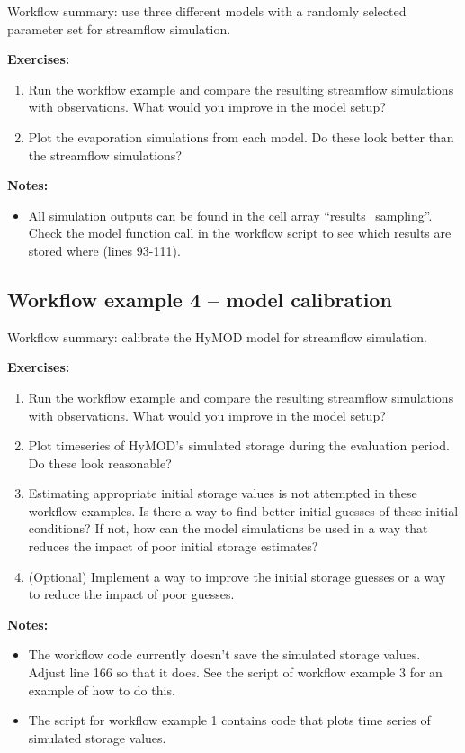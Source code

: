 \documentclass[12pt]{article}
\begin{document}
Workflow summary: use three different models with a randomly selected parameter set for streamflow simulation.

\medskip \noindent
\textbf{Exercises:}
\begin{enumerate}
	\item Run the workflow example and compare the resulting streamflow simulations with observations. What would you improve in the model setup?
	\item Plot the evaporation simulations from each model. Do these look better than the streamflow simulations? 
\end{enumerate}

\medskip \noindent
\textbf{Notes:}
\begin{itemize}
	\item All simulation outputs can be found in the cell array “results\_sampling”. Check the model function call in the workflow script to see which results are stored where (lines 93-111).
\end{itemize}


%
\subsection{Workflow example 4 – model calibration}

Workflow summary: calibrate the HyMOD model for streamflow simulation.

\medskip \noindent
\textbf{Exercises:}
\begin{enumerate}
	\item Run the workflow example and compare the resulting streamflow simulations with observations. What would you improve in the model setup?
	\item Plot timeseries of HyMOD’s simulated storage during the evaluation period. Do these look reasonable? 
	\item Estimating appropriate initial storage values is not attempted in these workflow examples. Is there a way to find better initial guesses of these initial conditions? If not, how can the model simulations be used in a way that reduces the impact of poor initial storage estimates?
	\item (Optional) Implement a way to improve the initial storage guesses or a way to reduce the impact of poor guesses.
\end{enumerate}

\medskip \noindent
\textbf{Notes:}
\begin{itemize}
	\item The workflow code currently doesn’t save the simulated storage values. Adjust line 166 so that it does. See the script of workflow example 3 for an example of how to do this.
	\item The script for workflow example 1 contains code that plots time series of simulated storage values.
\end{itemize}
\end{document}
